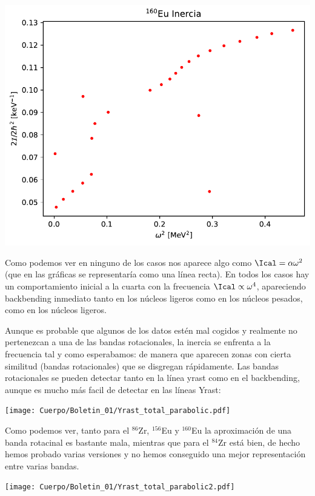     \begin{center}
        \includegraphics[width=0.6\linewidth]{Cuerpo/Boletin_01/160Eu_inercia.pdf}
    \end{center}
    Como podemos ver en ninguno de los casos nos aparece algo como $\Ical = \alpha \omega^2$ (que en las gráficas se representaría como una línea recta). En todos los casos hay un comportamiento  inicial a la cuarta con la frecuencia $\Ical \propto \omega^4$, apareciendo backbending inmediato tanto en los núcleos ligeros como en los núcleos pesados, como en los núcleos ligeros.

    Aunque es probable que algunos de los datos estén mal cogidos y realmente no pertenezcan a una de las bandas rotacionales, la inercia se enfrenta a la frecuencia tal y como esperabamos: de manera que aparecen zonas con cierta similitud (bandas rotacionales) que se disgregan rápidamente. Las bandas rotacionales se pueden detectar tanto en la línea yrast como en el backbending, aunque es mucho más facil de detectar en las líneas Yrast:


    \begin{center}
        \texttt{[image: Cuerpo/Boletin\_01/Yrast\_total\_parabolic.pdf]}
    \end{center}

    Como podemos ver, tanto para el $^{86}$Zr, $^{156}$Eu y $^{160}$Eu la aproximación de una banda rotacinal es bastante mala, mientras que para el $^{84}$Zr está bien, de hecho hemos probado varias versiones y no hemos conseguido una mejor representación entre varias bandas.

    \begin{center}
        \texttt{[image: Cuerpo/Boletin\_01/Yrast\_total\_parabolic2.pdf]}
    \end{center}






